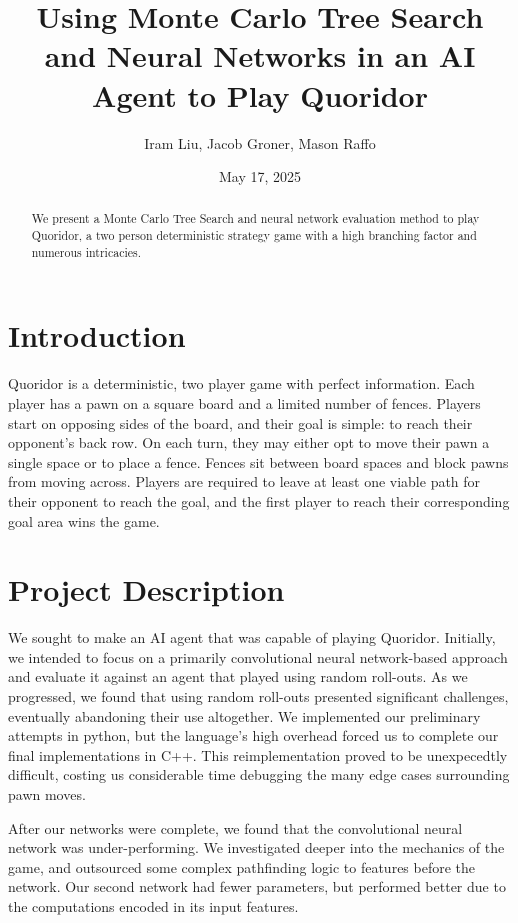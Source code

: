 \documentclass[10pt]{article}
\title{\bfseries Using Monte Carlo Tree Search and Neural Networks in an AI Agent to Play Quoridor}
\author{
    Iram Liu, Jacob Groner, Mason Raffo
}
\date{May 17, 2025}
\begin{document}
\maketitle

\begin{abstract}
We present a Monte Carlo Tree Search and neural network evaluation method to play Quoridor, a two person deterministic strategy game with a high branching factor and numerous intricacies.
\end{abstract}

\section{Introduction}
Quoridor is a deterministic, two player game with perfect information. Each player has a pawn on a square board and a limited number of fences. Players start on opposing sides of the board, and their goal is simple: to reach their opponent's back row. On each turn, they may either opt to move their pawn a single space or to place a fence. Fences sit between board spaces and block pawns from moving across. Players are required to leave at least one viable path for their opponent to reach the goal, and the first player to reach their corresponding goal area wins the game.

\section{Project Description}

We sought to make an AI agent that was capable of playing Quoridor. Initially, we intended to focus on a primarily convolutional neural network-based approach and evaluate it against an agent that played using random roll-outs. As we progressed, we found that using random roll-outs presented significant challenges, eventually abandoning their use altogether. We implemented our preliminary attempts in python, but the language's high overhead forced us to complete our final implementations in C++. This reimplementation proved to be unexpecedtly difficult, costing us considerable time debugging the many edge cases surrounding pawn moves.

After our networks were complete, we found that the convolutional neural network was under-performing. We investigated deeper into the mechanics of the game, and outsourced some complex pathfinding logic to features before the network. Our second network had fewer parameters, but performed better due to the computations encoded in its input features.
\end{document}
